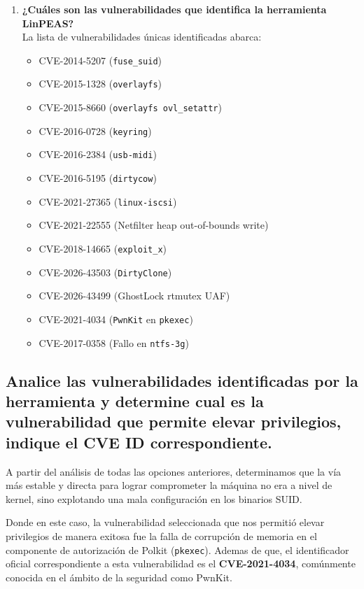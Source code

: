 \documentclass[letterpaper,11pt]{article}
\begin{document}
\begin{enumerate}[label=\alph*.]
    \item \textbf{¿Cuáles son las vulnerabilidades que identifica la herramienta LinPEAS?}\\
    La lista de vulnerabilidades únicas identificadas abarca:
    \begin{itemize}
        \item CVE-2014-5207 (\texttt{fuse\_suid})
        \item CVE-2015-1328 (\texttt{overlayfs})
        \item CVE-2015-8660 (\texttt{overlayfs ovl\_setattr})
        \item CVE-2016-0728 (\texttt{keyring})
        \item CVE-2016-2384 (\texttt{usb-midi})
        \item CVE-2016-5195 (\texttt{dirtycow})
        \item CVE-2021-27365 (\texttt{linux-iscsi})
        \item CVE-2021-22555 (Netfilter heap out-of-bounds write)
        \item CVE-2018-14665 (\texttt{exploit\_x})
        \item CVE-2026-43503 (\texttt{DirtyClone})
        \item CVE-2026-43499 (GhostLock rtmutex UAF)
        \item CVE-2021-4034 (\texttt{PwnKit} en \texttt{pkexec})
        \item CVE-2017-0358 (Fallo en \texttt{ntfs-3g})
    \end{itemize}
\end{enumerate}

\subsection{Analice las vulnerabilidades identificadas por la herramienta y determine cual es la vulnerabilidad que permite elevar privilegios, indique el CVE ID correspondiente.}

A partir del análisis de todas las opciones anteriores, determinamos que la vía más estable y directa para lograr comprometer la máquina no era a nivel de kernel, sino explotando una mala configuración en los binarios SUID. 

Donde en este caso, la vulnerabilidad seleccionada que nos permitió elevar privilegios de manera exitosa fue la falla de corrupción de memoria en el componente de autorización de Polkit (\texttt{pkexec}). Ademas de que, el identificador oficial correspondiente a esta vulnerabilidad es el \textbf{CVE-2021-4034}, comúnmente conocida en el ámbito de la seguridad como PwnKit.
\end{document}
